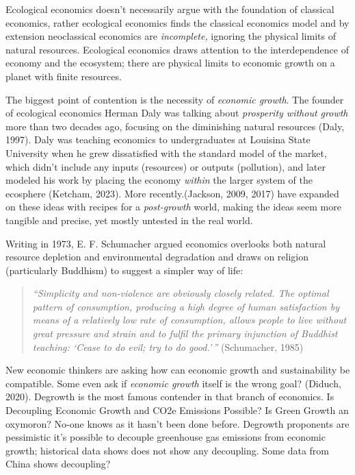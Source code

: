 \documentclass[
  letterpaper,
  DIV=11,
  numbers=noendperiod]{scrartcl}
\begin{document}
Ecological economics doesn't necessarily argue with the foundation of
classical economics, rather ecological economics finds the classical
economics model and by extension neoclassical economics are
\emph{incomplete,} ignoring the physical limits of natural resources.
Ecological economics draws attention to the interdependence of economy
and the ecosystem; there are physical limits to economic growth on a
planet with finite resources.

The biggest point of contention is the necessity of \emph{economic
growth}. The founder of ecological economics Herman Daly was talking
about \emph{prosperity without growth} more than two decades ago,
focusing on the diminishing natural resources (Daly, 1997). Daly was
teaching economics to undergraduates at Louisina State University when
he grew dissatisfied with the standard model of the market, which didn't
include any inputs (resources) or outputs (pollution), and later modeled
his work by placing the economy \emph{within} the larger system of the
ecosphere (Ketcham, 2023). More recently.(Jackson, 2009, 2017) have
expanded on these ideas with recipes for a \emph{post-growth} world,
making the ideas seem more tangible and precise, yet mostly untested in
the real world.

Writing in 1973, E. F. Schumacher argued economics overlooks both
natural resource depletion and environmental degradation and draws on
religion (particularly Buddhism) to suggest a simpler way of life:

\begin{quote}
\emph{``Simplicity and non-violence are obviously closely related. The
optimal pattern of consumption, producing a high degree of human
satisfaction by means of a relatively low rate of consumption, allows
people to live without great pressure and strain and to fulfil the
primary injunction of Buddhist teaching: `Cease to do evil; try to do
good.'\,''} (Schumacher, 1985)
\end{quote}

New economic thinkers are asking how can economic growth and
sustainability be compatible. Some even ask if \emph{economic growth}
itself is the wrong goal? (Diduch, 2020). Degrowth is the most famous
contender in that branch of economics. Is Decoupling Economic Growth and
CO2e Emissions Possible? Is Green Growth an oxymoron? No-one knows as it
hasn't been done before. Degrowth proponents are pessimistic it's
possible to decouple greenhouse gas emissions from economic growth;
historical data shows does not show any decoupling. Some data from China
shows decoupling?
\end{document}

